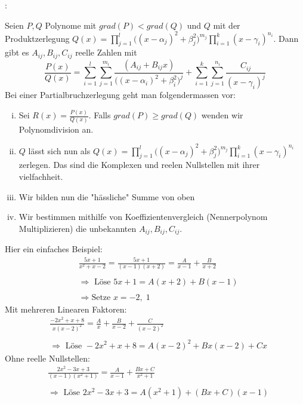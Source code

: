 \documentclass[7pt,landscape, margin = 0.1mm]{article}
\newcommand{\KRZ}[2]{\vspace{1mm} \hline \vspace{1mm} \color{chaptercolor}{RC #1}:\color{black} \   \hspace{0.2cm}\vspace{1mm}   {\begin{minipage}{20em}
#2 \end{minipage}} \vspace{1mm}  \hline \vspace{1mm}  \\}
\begin{document}
\begin{multicols}{4}
\KRZ{Partialbruchzerlegung}{Seien $P, Q$ Polynome mit $grad(P) < grad(Q)$ und $Q$ mit der Produktzerlegung $Q(x) = \prod_{j = 1}^l \big( (x- \alpha_j)^2 + \beta_j^2\big)^{m_j} \prod_{i = 1}^k (x - \gamma_i)^{n_i}$. Dann gibt es $A_{ij}, B_{ij}, C_{ij}$ reelle Zahlen mit
$$
  \frac{P(x)}{Q(x)} = \sum_{i = 1}^l \sum_{j = 1}^{m_i} \frac{(A_{ij} + B_{ij}x)}{\big( (x- \alpha_i)^2 + \beta_i^2\big)^j} + \sum_{i = 1}^k \sum_{j = 1}^{n_i} \frac{C_{ij}}{(x-\gamma_i)^j}
$$
Bei einer Partialbruchzerlegung geht man folgendermassen vor:
\begin{enumerate}[(i)]
  \item Sei $R(x) = \frac{P(x)}{Q(x)}$. Falls $grad(P) \geq grad(Q)$ wenden wir Polynomdivision an.
  \item $Q$ lässt sich nun als $Q(x) = \prod_{j = 1}^l \big( (x- \alpha_j)^2 + \beta_j^2\big)^{m_j} \prod_{i = 1}^k (x - \gamma_i)^{n_i}$ zerlegen. Das sind
  die Komplexen und reelen Nullstellen mit ihrer vielfachheit.
  \item Wir bilden nun die "hässliche" Summe von oben
  \item Wir bestimmen mithilfe von Koeffizientenvergleich (Nennerpolynom Multiplizieren) die unbekannten $A_{ij}, B_{ij}, C_{ij}$.
\end{enumerate}
Hier ein einfaches Beispiel:
\begin{align*}
  &\frac{5x + 1}{x^2 + x - 2} = \frac{5x + 1}{(x - 1)(x + 2)} = \frac{A}{x - 1} + \frac{B}{x + 2}\\ \\
  &\Rightarrow \text{ Löse } 5x + 1 = A(x + 2) + B(x - 1)\\ \\
  &\Rightarrow \text{Setze } x = -2,\;1
\end{align*}
Mit mehreren Linearen Faktoren:
\begin{align*}
  &\frac{-2x^2 + x + 8}{x (x-2)^2} = \frac{A}{x} + \frac{B}{x - 2} + \frac{C}{(x-2)^2}\\ \\
  &\Rightarrow \text{ Löse } -2x^2 + x + 8 = A(x - 2)^2 + Bx(x - 2) + Cx
\end{align*}
Ohne reelle Nullstellen:
\begin{align*}
  &\frac{2x^2 -3x + 3}{(x-1)(x^2 + 1)} = \frac{A}{x - 1} + \frac{Bx + C}{x^2 + 1}\\ \\
  &\Rightarrow \text{ Löse } 2x^2 -3x + 3 = A(x^2 + 1) + (Bx + C)(x - 1)\\ \\

\end{align*}}
\end{multicols}
\end{document}
